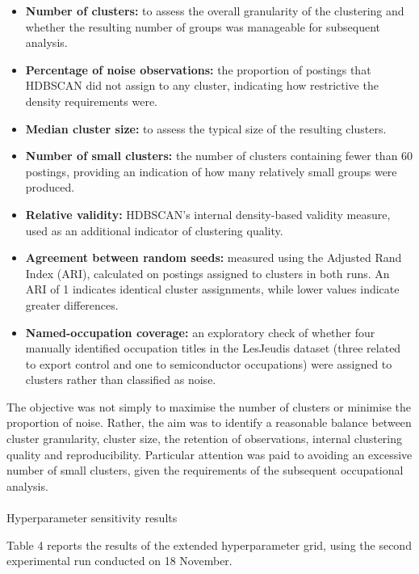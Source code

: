 \documentclass[
  letterpaper,
  DIV=11,
  numbers=noendperiod,
  sfdefaults=false]{scrartcl}
\makeatletter
\let\oldparagraph\paragraph
\renewcommand{\paragraph}{
    \@ifstar
      \xxxParagraphStar
      \xxxParagraphNoStar
  }
\newcommand{\xxxParagraphStar}[1]{\oldparagraph*{#1}\mbox{}}
\newcommand{\xxxParagraphNoStar}[1]{\oldparagraph{#1}\mbox{}}
\providecommand{\tightlist}{%
  \setlength{\itemsep}{0pt}\setlength{\parskip}{0pt}}
\makeatother
\begin{document}
\begin{itemize}
\tightlist
\item
  \textbf{Number of clusters:} to assess the overall granularity of the
  clustering and whether the resulting number of groups was manageable
  for subsequent analysis.
\item
  \textbf{Percentage of noise observations:} the proportion of postings
  that HDBSCAN did not assign to any cluster, indicating how restrictive
  the density requirements were.
\item
  \textbf{Median cluster size:} to assess the typical size of the
  resulting clusters.
\item
  \textbf{Number of small clusters:} the number of clusters containing
  fewer than 60 postings, providing an indication of how many relatively
  small groups were produced.
\item
  \textbf{Relative validity:} HDBSCAN's internal density-based validity
  measure, used as an additional indicator of clustering quality.
\item
  \textbf{Agreement between random seeds:} measured using the Adjusted
  Rand Index (ARI), calculated on postings assigned to clusters in both
  runs. An ARI of 1 indicates identical cluster assignments, while lower
  values indicate greater differences.
\item
  \textbf{Named-occupation coverage:} an exploratory check of whether
  four manually identified occupation titles in the LesJeudis dataset
  (three related to export control and one to semiconductor occupations)
  were assigned to clusters rather than classified as noise.
\end{itemize}

The objective was not simply to maximise the number of clusters or
minimise the proportion of noise. Rather, the aim was to identify a
reasonable balance between cluster granularity, cluster size, the
retention of observations, internal clustering quality and
reproducibility. Particular attention was paid to avoiding an excessive
number of small clusters, given the requirements of the subsequent
occupational analysis.

\paragraph{Hyperparameter sensitivity
results}\label{hyperparameter-sensitivity-results}

Table 4 reports the results of the extended hyperparameter grid, using
the second experimental run conducted on 18 November.
\end{document}
